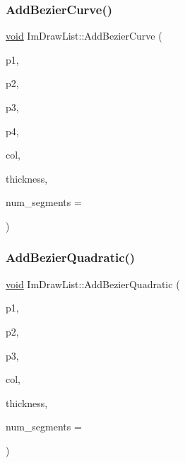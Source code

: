 \subsubsection{\texorpdfstring{Add\+Bezier\+Curve()}{AddBezierCurve()}}
{\footnotesize\ttfamily \hyperlink{imgui__impl__opengl3__loader_8h_ac668e7cffd9e2e9cfee428b9b2f34fa7}{void} Im\+Draw\+List\+::\+Add\+Bezier\+Curve (\begin{DoxyParamCaption}\item[{const \hyperlink{structImVec2}{Im\+Vec2} \&}]{p1,  }\item[{const \hyperlink{structImVec2}{Im\+Vec2} \&}]{p2,  }\item[{const \hyperlink{structImVec2}{Im\+Vec2} \&}]{p3,  }\item[{const \hyperlink{structImVec2}{Im\+Vec2} \&}]{p4,  }\item[{Im\+U32}]{col,  }\item[{float}]{thickness,  }\item[{int}]{num\+\_\+segments = {} }\end{DoxyParamCaption})\hspace{0.3cm}{\ttfamily [inline]}}

\mbox{\label{structImDrawList_a2ca1f97b873778fc53fa4c1f1ca8bb1f}} 
\subsubsection{\texorpdfstring{Add\+Bezier\+Quadratic()}{AddBezierQuadratic()}}
{\footnotesize\ttfamily \hyperlink{imgui__impl__opengl3__loader_8h_ac668e7cffd9e2e9cfee428b9b2f34fa7}{void} Im\+Draw\+List\+::\+Add\+Bezier\+Quadratic (\begin{DoxyParamCaption}\item[{const \hyperlink{structImVec2}{Im\+Vec2} \&}]{p1,  }\item[{const \hyperlink{structImVec2}{Im\+Vec2} \&}]{p2,  }\item[{const \hyperlink{structImVec2}{Im\+Vec2} \&}]{p3,  }\item[{Im\+U32}]{col,  }\item[{float}]{thickness,  }\item[{int}]{num\+\_\+segments = {} }\end{DoxyParamCaption})}

